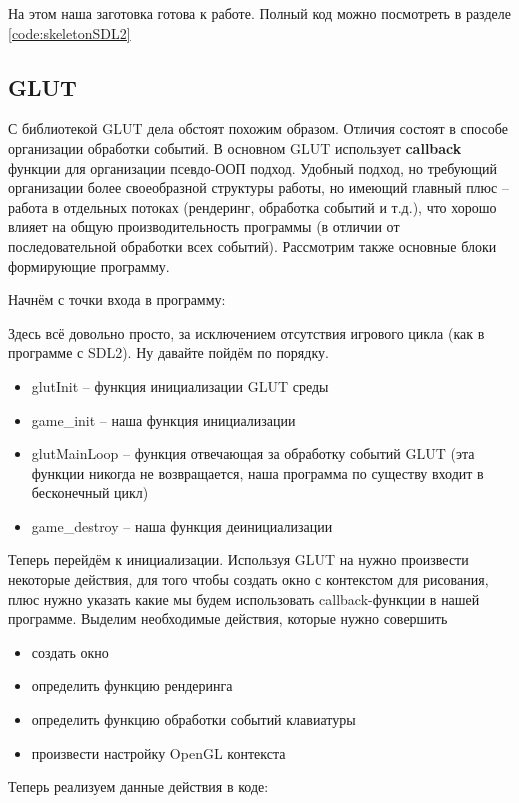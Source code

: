 На этом наша заготовка готова к работе. Полный код можно посмотреть в разделе \ref{code:skeletonSDL2}

\subsection{GLUT}
С библиотекой GLUT дела обстоят похожим образом. Отличия состоят в способе организации обработки событий.
В основном GLUT использует \textbf{callback} функции для организации псевдо-ООП подход. Удобный подход, но 
требующий организации более своеобразной структуры работы, но имеющий главный плюс -- работа в отдельных 
потоках (рендеринг, обработка событий и т.д.), что хорошо влияет на общую производительность программы 
(в отличии от последовательной обработки всех событий). Рассмотрим также основные блоки формирующие 
программу.

Начнём с точки входа в программу:


Здесь всё довольно просто, за исключением отсутствия игрового цикла (как в программе с SDL2). Ну давайте 
пойдём по порядку.
\begin{itemize}
    \item glutInit -- функция инициализации GLUT среды
    \item game\_init -- наша функция инициализации
    \item glutMainLoop -- функция отвечающая за обработку событий GLUT (эта функции никогда не 
        возвращается, наша программа по существу входит в бесконечный цикл)
    \item game\_destroy -- наша функция деинициализации
\end{itemize}

Теперь перейдём к инициализации. Используя GLUT на нужно произвести некоторые действия, для того чтобы 
создать окно с контекстом для рисования, плюс нужно указать какие мы будем использовать callback-функции 
в нашей программе. Выделим необходимые действия, которые нужно совершить
\begin{itemize}
    \item создать окно
    \item определить функцию рендеринга
    \item определить функцию обработки событий клавиатуры
    \item произвести настройку OpenGL контекста
\end{itemize} 

Теперь реализуем данные действия в коде:


